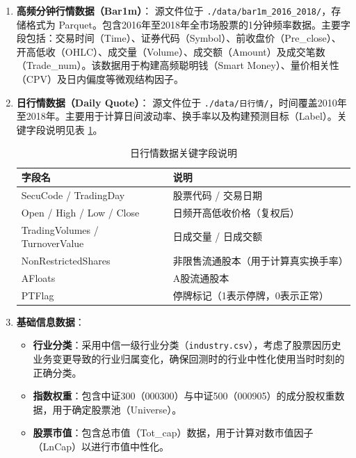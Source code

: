 \documentclass[10pt,compsoc,UTF8]{CjC}
\begin{document}
\begin{enumerate}
    \item \textbf{高频分钟行情数据（Bar1m）}：
    源文件位于 \texttt{./data/bar1m\_2016\_2018/}，存储格式为 Parquet。包含2016年至2018年全市场股票的1分钟频率数据。主要字段包括：交易时间（Time）、证券代码（Symbol）、前收盘价（Pre\_close）、开高低收（OHLC）、成交量（Volume）、成交额（Amount）及成交笔数（Trade\_num）。该数据用于构建高频聪明钱（Smart Money）、量价相关性（CPV）及日内偏度等微观结构因子。

    \item \textbf{日行情数据（Daily Quote）}：
    源文件位于 \texttt{./data/日行情/}，时间覆盖2010年至2018年。主要用于计算日间波动率、换手率以及构建预测目标（Label）。关键字段说明见表 \ref{tab:daily_data}。
    
    \begin{table}[H]
    \centering
            \caption{日行情数据关键字段说明}
        \label{tab:daily_data}
        \begin{tabular}{l|l}
            \toprule
            \textbf{字段名} & \textbf{说明} \\
            \midrule
            SecuCode / TradingDay & 股票代码 / 交易日期 \\
            Open / High / Low / Close & 日频开高低收价格（复权后） \\
            TradingVolumes / TurnoverValue & 日成交量 / 日成交额 \\
            NonRestrictedShares & 非限售流通股本（用于计算真实换手率） \\
            AFloats & A股流通股本 \\
            PTFlag & 停牌标记（1表示停牌，0表示正常） \\
            \bottomrule
        \end{tabular}
    \end{table}
\newpage
    \item \textbf{基础信息数据}：
    \begin{itemize}
        \item \textbf{行业分类}：采用中信一级行业分类（\texttt{industry.csv}），考虑了股票因历史业务变更导致的行业归属变化，确保回测时的行业中性化使用当时时刻的正确分类。
        \item \textbf{指数权重}：包含中证300（000300）与中证500（000905）的成分股权重数据，用于确定股票池（Universe）。
        \item \textbf{股票市值}：包含总市值（Tot\_cap）数据，用于计算对数市值因子（LnCap）以进行市值中性化。
    \end{itemize}
\end{enumerate}
\end{document}
